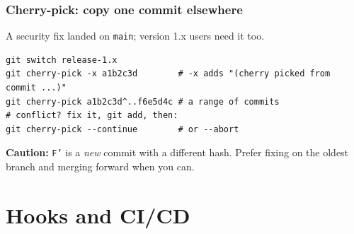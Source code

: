 \documentclass[aspectratio=169,10pt,compress]{beamer}
\begin{document}
\begin{frame}[t,fragile] \frametitle{Cherry-pick: copy one commit elsewhere}
  A security fix landed on \texttt{main}; version 1.x users need it too.

  \begin{center}
  \end{center}

\begin{lstlisting}
git switch release-1.x
git cherry-pick -x a1b2c3d        # -x adds "(cherry picked from commit ...)"
git cherry-pick a1b2c3d^..f6e5d4c # a range of commits
# conflict? fix it, git add, then:
git cherry-pick --continue        # or --abort
\end{lstlisting}
  \small \textbf{Caution:} \texttt{F'} is a \emph{new} commit with a different hash.
  Prefer fixing on the oldest branch and merging forward when you can.
\end{frame}

\section[CI/CD]{Hooks and CI/CD}
\end{document}
